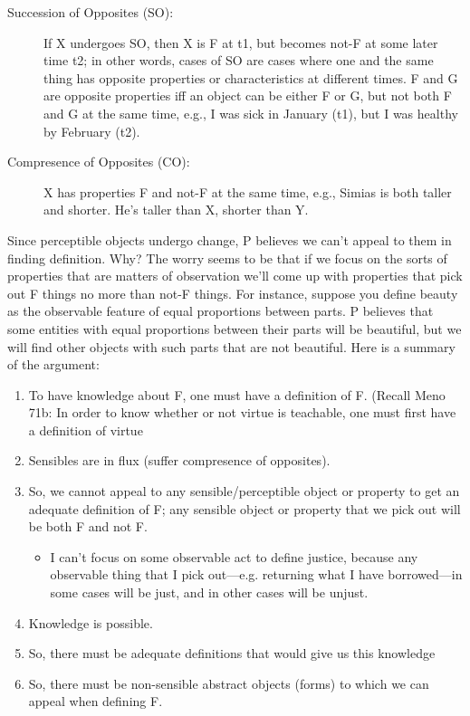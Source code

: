 \documentclass[oneside]{article}
\begin{document}
\begin{description}
\item[Succession of Opposites (SO):] If X undergoes SO, then X is F at t1, but
becomes not-F at some later time t2; in other words, cases of SO are
cases where one and the same thing has opposite properties or
characteristics at different times. F and G are opposite properties iff an object can be either F or G, but not both F and G at the same time, e.g., I was sick in January (t1), but I was healthy by February (t2).

\item[Compresence of Opposites (CO):] X has  properties F and not-F at the same time, e.g., Simias is both taller and shorter. He's taller than X, shorter than Y.

\end{description}
Since perceptible objects undergo change, P believes we can't appeal to them in finding definition. Why?  The worry seems to be that if we focus on the sorts of properties that are matters of observation we'll come up with properties that pick out F things no more than not-F things. For instance, suppose you define beauty as the observable feature of equal proportions between parts. P believes that some entities with equal proportions between their parts will be beautiful, but we will find other objects with such parts that are not beautiful. Here is a summary of the argument: 
\begin{enumerate}
\item  To have knowledge about F, one must have a definition of F. (Recall  Meno 71b: In order to know whether or not virtue is teachable,  one must first have a definition of virtue
\item  Sensibles are in flux  (suffer compresence of opposites).
\item  So, we cannot appeal to any sensible/perceptible object or property to get an adequate definition
  of F; any sensible object or property that we pick out will be both F  and not F.
\begin{itemize}
\item I can't focus on some observable act to define justice, because any observable
thing that I pick out---e.g. returning what I have borrowed---in some
cases will be just, and in other cases will be unjust.
\end{itemize}
\item Knowledge is possible.
\item  So, there must be adequate definitions that would give us this knowledge
\item So, there must be non-sensible abstract objects (forms) to which we can appeal when
  defining F.
\end{enumerate}
\end{document}
